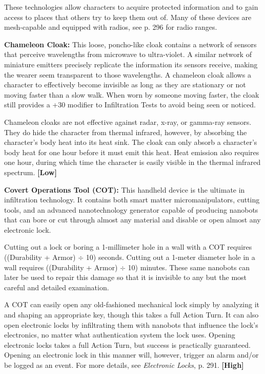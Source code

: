 These technologies allow characters to acquire protected information and to gain access to places that others try to keep them out of. Many of these devices are mesh-capable and equipped with radios, see p. 296 for radio ranges.

\textbf{Chameleon Cloak:} This loose, poncho-like cloak contains a network of sensors that perceive wavelengths from microwave to ultra-violet. A similar network of miniature emitters precisely replicate the information its sensors receive, making the wearer seem transparent to those wavelengths. A chameleon cloak allows a character to effectively become invisible as long as they are stationary or not moving faster than a slow walk. When worn by someone moving faster, the cloak still provides a +30 modifier to Infiltration Tests to avoid being seen or noticed.

Chameleon cloaks are not effective against radar, x-ray, or gamma-ray sensors. They do hide the character from thermal infrared, however, by absorbing the character’s body heat into its heat sink. The cloak can only absorb a character’s body heat for one hour before it must emit this heat. Heat emission also requires one hour, during which time the character is easily visible in the thermal infrared spectrum. \textbf{[Low]}

\textbf{Covert Operations Tool (COT):} This handheld device is the ultimate in infiltration technology. It contains both smart matter micromanipulators, cutting tools, and an advanced nanotechnology generator capable of producing nanobots that can bore or cut through almost any material and disable or open almost any electronic lock.

Cutting out a lock or boring a 1-millimeter hole in a wall with a COT requires ((Durability + Armor) $\div$ 10) seconds. Cutting out a 1-meter diameter hole in a wall requires ((Durability + Armor) $\div$ 10) minutes. These same nanobots can later be used to repair this damage so that it is invisible to any but the most careful and detailed examination.

A COT can easily open any old-fashioned mechanical lock simply by analyzing it and shaping an appropriate key, though this takes a full Action Turn. It can also open electronic locks by infiltrating them with nanobots that influence the lock’s electronics, no matter what authentication system the lock uses. Opening electronic locks takes a full Action Turn, but success is practically guaranteed. Opening an electronic lock in this manner will, however, trigger an alarm and/or be logged as an event. For more details, see \emph{Electronic Locks}, p. 291. \textbf{[High]}

